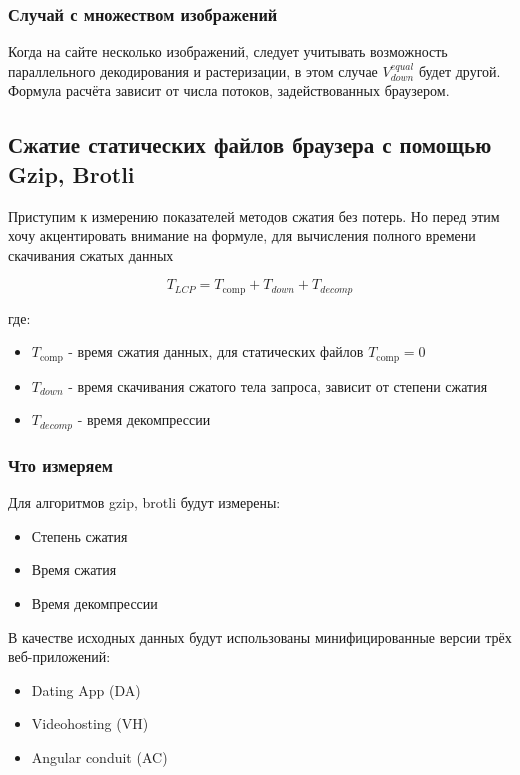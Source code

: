 \documentclass[12pt]{article}
\begin{document}
\subsubsection{Случай с множеством изображений }

Когда на сайте несколько изображений, следует учитывать возможность параллельного декодирования и растеризации, в этом случае $V^{equal}_{down}$ будет другой. Формула расчёта зависит от числа потоков, задействованных браузером.

\subsection{Сжатие статических файлов браузера с помощью Gzip, Brotli}

Приступим к измерению показателей методов сжатия без потерь. Но перед этим хочу акцентировать внимание на формуле, для вычисления полного времени скачивания сжатых данных

\begin{equation}
    T_{LCP} = T_{\text{comp}} + T_{down} + T_{decomp}
\end{equation}

где:

\begin{itemize}
    \item $T_{\text{comp}}$ - время сжатия данных, для статических файлов $T_{\text{comp}}=0$
    \item $T_{down}$ - время скачивания сжатого тела запроса, зависит от степени сжатия
    \item $T_{decomp}$ - время декомпрессии
\end{itemize}

\subsubsection{Что измеряем}

Для алгоритмов gzip, brotli будут измерены:

\begin{itemize}[label=-]
    \item Степень сжатия
    \item Время сжатия
    \item Время декомпрессии
\end{itemize}

В качестве исходных данных будут использованы минифицированные версии трёх веб-приложений:

\begin{itemize}[label=-]
    \item Dating App (DA)
    \item Videohosting (VH)
    \item Angular conduit (AC)
\end{itemize}
\end{document}
